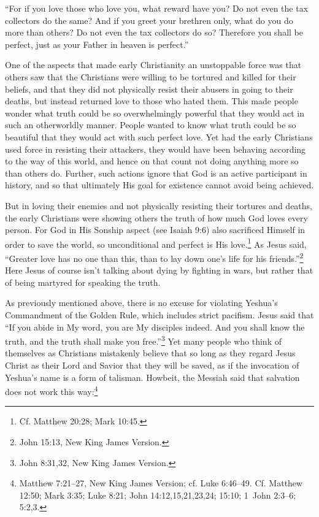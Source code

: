 \documentclass[letterpaper,12pt]{article}
\newenvironment{squote}
  {\small\quote}
  {\endquote\normalsize}
\begin{document}
\begin{squote}
``For if you love those who love you, what reward have you? Do not even the tax collectors do the same? And if you greet your brethren only, what do you do more than others? Do not even the tax collectors do so? Therefore you shall be perfect, just as your Father in heaven is perfect.''
\end{squote}

One of the aspects that made early Christianity an unstoppable force was that others saw that the Christians were willing to be tortured and killed for their beliefs, and that they did not physically resist their abusers in going to their deaths, but instead returned love to those who hated them. This made people wonder what truth could be so overwhelmingly powerful that they would act in such an otherworldly manner. People wanted to know what truth could be so beautiful that they would act with such perfect love. Yet had the early Christians used force in resisting their attackers, they would have been behaving according to the way of this world, and hence on that count not doing anything more so than others do. Further, such actions ignore that God is an active participant in history, and so that ultimately His goal for existence cannot avoid being achieved.

But in loving their enemies and not physically resisting their tortures and deaths, the early Christians were showing others the truth of how much God loves every person. For God in His Sonship aspect (see Isaiah 9:6) also sacrificed Himself in order to save the world, so unconditional and perfect is His love.\footnote{Cf. Matthew 20:28; Mark 10:45.} As Jesus said, ``Greater love has no one than this, than to lay down one's life for his friends.''\footnote{John 15:13, New King James Version.} Here Jesus of course isn't talking about dying by fighting in wars, but rather that of being martyred for speaking the truth.

As previously mentioned above, there is no excuse for violating Yeshua's Commandment of the Golden Rule, which includes strict pacifism. Jesus said that ``If you abide in My word, you are My disciples indeed. And you shall know the truth, and the truth shall make you free.''\footnote{John 8:31,32, New King James Version.} Yet many people who think of themselves as Christians mistakenly believe that so long as they regard Jesus Christ as their Lord and Savior that they will be saved, as if the invocation of Yeshua's name is a form of talisman. Howbeit, the Messiah said that salvation does not work this way:\footnote{Matthew 7:21--27, New King James Version; cf. Luke 6:46--49. Cf. Matthew 12:50; Mark 3:35; Luke 8:21; John 14:12,15,21,23,24; 15:10; 1~John 2:3--6; 5:2,3.}
\end{document}
